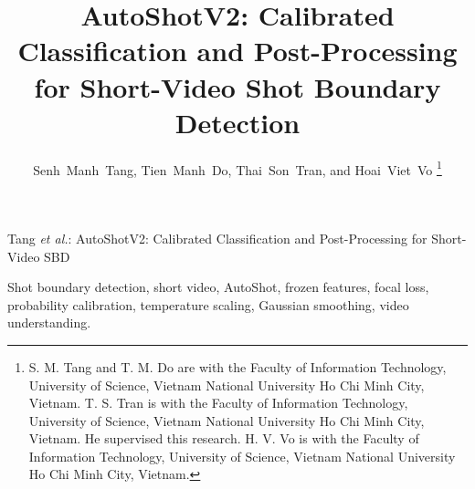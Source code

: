 \documentclass[journal]{IEEEtran}
\begin{document}
\title{AutoShotV2: Calibrated Classification and Post-Processing for Short-Video Shot Boundary Detection}

\author{Senh~Manh~Tang, Tien~Manh~Do, Thai~Son~Tran, and Hoai~Viet~Vo%
\thanks{S. M. Tang and T. M. Do are with the Faculty of Information Technology,
University of Science, Vietnam National University Ho Chi Minh City, Vietnam.
T. S. Tran is with the Faculty of Information Technology,
University of Science, Vietnam National University Ho Chi Minh City, Vietnam.
He supervised this research.
H. V. Vo is with the Faculty of Information Technology,
University of Science, Vietnam National University Ho Chi Minh City, Vietnam.}}

%
{Tang \MakeLowercase{\textit{et al.}}: AutoShotV2: Calibrated Classification and Post-Processing for Short-Video SBD}

\maketitle



\begin{IEEEkeywords}
Shot boundary detection, short video, AutoShot, frozen features, focal loss, probability calibration, temperature scaling, Gaussian smoothing, video understanding.
\end{IEEEkeywords}

\IEEEpeerreviewmaketitle








\ifCLASSOPTIONcaptionsoff
  \newpage
\fi
\end{document}
